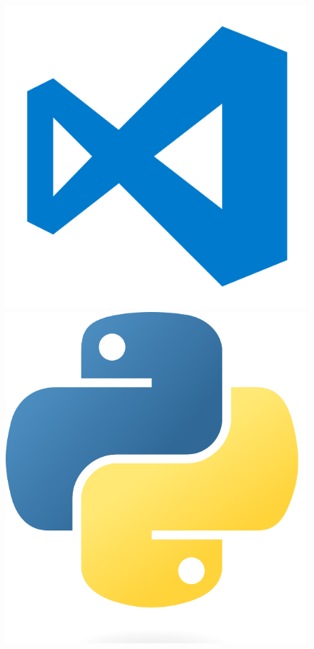 \begin{figure}[h]
    \begin{center}
        \begin{minipage}[b]{0.35\linewidth}
            \centering
            \includegraphics[width=\linewidth]{images/image2.png}
        \end{minipage}
        \begin{minipage}[b]{0.35\linewidth}
            \centering
            \includegraphics[width=\linewidth]{images/image3.png}
        \end{minipage}
    \end{center}
\end{figure}

